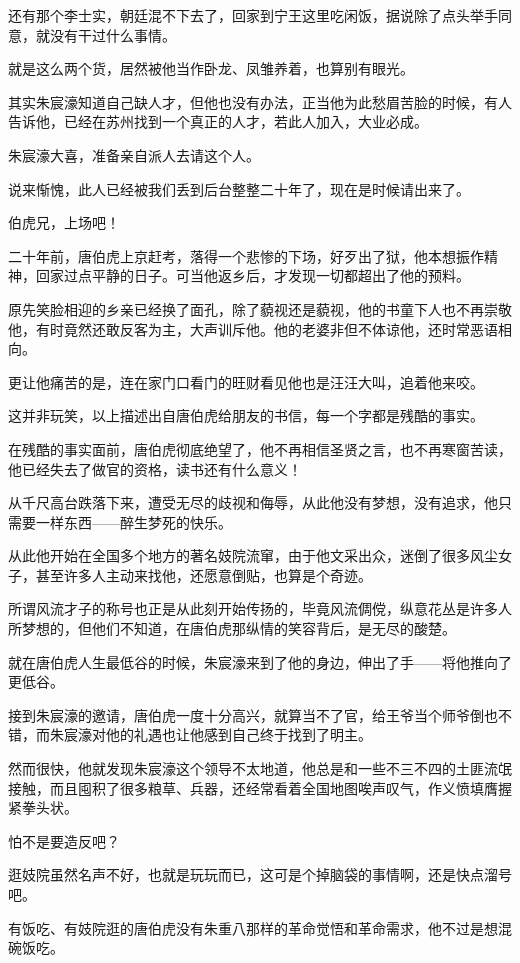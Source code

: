 \begin{multicols}{\theparacolNo}
		还有那个李士实，朝廷混不下去了，回家到宁王这里吃闲饭，据说除了点头举手同意，就没有干过什么事情。

		就是这么两个货，居然被他当作卧龙、凤雏养着，也算别有眼光。

		其实朱宸濠知道自己缺人才，但他也没有办法，正当他为此愁眉苦脸的时候，有人告诉他，已经在苏州找到一个真正的人才，若此人加入，大业必成。

		朱宸濠大喜，准备亲自派人去请这个人。

		说来惭愧，此人已经被我们丢到后台整整二十年了，现在是时候请出来了。

		伯虎兄，上场吧！

		二十年前，唐伯虎上京赶考，落得一个悲惨的下场，好歹出了狱，他本想振作精神，回家过点平静的日子。可当他返乡后，才发现一切都超出了他的预料。

		原先笑脸相迎的乡亲已经换了面孔，除了藐视还是藐视，他的书童下人也不再崇敬他，有时竟然还敢反客为主，大声训斥他。他的老婆非但不体谅他，还时常恶语相向。

		更让他痛苦的是，连在家门口看门的旺财看见他也是汪汪大叫，追着他来咬。

		这并非玩笑，以上描述出自唐伯虎给朋友的书信，每一个字都是残酷的事实。

		在残酷的事实面前，唐伯虎彻底绝望了，他不再相信圣贤之言，也不再寒窗苦读，他已经失去了做官的资格，读书还有什么意义！

		从千尺高台跌落下来，遭受无尽的歧视和侮辱，从此他没有梦想，没有追求，他只需要一样东西——醉生梦死的快乐。

		从此他开始在全国多个地方的著名妓院流窜，由于他文采出众，迷倒了很多风尘女子，甚至许多人主动来找他，还愿意倒贴，也算是个奇迹。

		所谓风流才子的称号也正是从此刻开始传扬的，毕竟风流倜傥，纵意花丛是许多人所梦想的，但他们不知道，在唐伯虎那纵情的笑容背后，是无尽的酸楚。

		就在唐伯虎人生最低谷的时候，朱宸濠来到了他的身边，伸出了手——将他推向了更低谷。

		接到朱宸濠的邀请，唐伯虎一度十分高兴，就算当不了官，给王爷当个师爷倒也不错，而朱宸濠对他的礼遇也让他感到自己终于找到了明主。

		然而很快，他就发现朱宸濠这个领导不太地道，他总是和一些不三不四的土匪流氓接触，而且囤积了很多粮草、兵器，还经常看着全国地图唉声叹气，作义愤填膺握紧拳头状。

		怕不是要造反吧？

		逛妓院虽然名声不好，也就是玩玩而已，这可是个掉脑袋的事情啊，还是快点溜号吧。

		有饭吃、有妓院逛的唐伯虎没有朱重八那样的革命觉悟和革命需求，他不过是想混碗饭吃。


\end{multicols}
